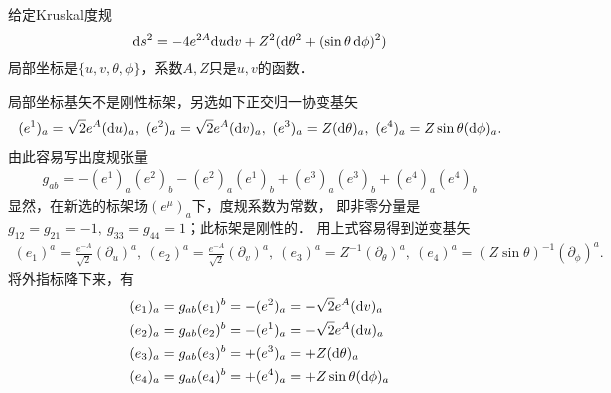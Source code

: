 \begin{example}\label{chrg:exm_Kruskal}
给定Kruskal度规
\begin{equation}
{\rm d}s^2= -4 e^{2A} {\rm d}u {\rm d}v + Z^{2}({\rm d}\theta^2 + (\sin\theta \, {\rm d}\phi)^2)
\end{equation}
局部坐标是$\{u,v,\theta,\phi \}$，系数$A,Z$只是$u,v$的函数．
\end{example}
\noindent {}
局部坐标基矢不是刚性标架，另选如下正交归一协变基矢
\begin{align*}
  (e^1)_{a}  = \sqrt{2}e^A ({\rm d}u)_{a},\
  (e^2)_{a}  = \sqrt{2}e^A ({\rm d}v)_{a},    \
  (e^3)_{a}  = Z ({\rm d}\theta)_{a}, \
  (e^4)_{a}  = Z \sin\theta ({\rm d}\phi)_{a}.
\end{align*}
由此容易写出度规张量
\begin{align*}
  g_{ab}  = - (e^1)_{a}(e^2)_{b} - (e^2)_{a}(e^1)_{b}
    + (e^3)_{a}(e^3)_{b}  + (e^4)_{a}(e^4)_{b}
\end{align*}
显然，在新选的标架场$(e^\mu)_a$下，度规系数为常数，
即非零分量是$g_{12}=g_{21}=-1,\ g_{33}=g_{44}=1$；此标架是刚性的．
用上式容易得到逆变基矢
\begin{align*}
(e_1)^{a}  = \frac{e^{-A}}{\sqrt{2}} (\partial_u)^{a},\
    (e_2)^{a}  = \frac{e^{-A}}{\sqrt{2}} (\partial_v)^{a},    \
(e_3)^{a}  = Z^{-1} (\partial_\theta)^{a},\
 (e_4)^{a}  = (Z \sin\theta)^{-1} (\partial_\phi)^{a}.
\end{align*}
将外指标降下来，有
\begin{align*}
  (e_1)_{a}&=g_{ab} (e_1)^{b}= -(e^2)_{a} =-\sqrt{2}e^A ({\rm d}v)_{a} \\
  (e_2)_{a}&=g_{ab} (e_2)^{b}= -(e^1)_{a} =-\sqrt{2}e^A ({\rm d}u)_{a} \\
  (e_3)_{a}&=g_{ab} (e_3)^{b}= +(e^3)_{a} =+Z ({\rm d}\theta)_{a} \\
  (e_4)_{a}&=g_{ab} (e_4)^{b}= +(e^4)_{a} =+Z \sin\theta ({\rm d}\phi)_{a}
\end{align*}

